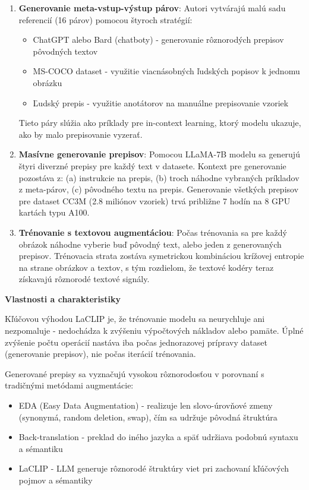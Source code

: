 \documentclass[]{tukediphc}
\begin{document}
\begin{enumerate}
\item \textbf{Generovanie meta-vstup-výstup párov}: Autori vytvárajú malú sadu referencií (16 párov) pomocou štyroch stratégií:
\begin{itemize}
\item ChatGPT alebo Bard (chatboty) - generovanie rôznorodých prepisov pôvodných textov
\item MS-COCO dataset - využitie viacnásobných ľudských popisov k jednomu obrázku
\item Ľudský prepis - využitie anotátorov na manuálne prepisovanie vzoriek
\end{itemize}
Tieto páry slúžia ako príklady pre in-context learning, ktorý modelu ukazuje, ako by malo prepisovanie vyzerať\cite{LaCLIP}.

\item \textbf{Masívne generovanie prepisov}: Pomocou LLaMA-7B modelu sa generujú štyri diverzné prepisy pre každý text v datasete. Kontext pre generovanie pozostáva z: (a) instrukcie na prepis, (b) troch náhodne vybraných príkladov z meta-párov, (c) pôvodného textu na prepis. Generovanie všetkých prepisov pre dataset CC3M (2.8 miliónov vzoriek) trvá približne 7 hodín na 8 GPU kartách typu A100\cite{LaCLIP}.

\item \textbf{Trénovanie s textovou augmentáciou}: Počas trénovania sa pre každý obrázok náhodne vyberie buď pôvodný text, alebo jeden z generovaných prepisov. Trénovacia strata zostáva symetrickou kombináciou krížovej entropie na strane obrázkov a textov, s tým rozdielom, že textové kodéry teraz získavajú rôznorodé textové signály\cite{LaCLIP}.
\end{enumerate}

\textbf{Vlastnosti a charakteristiky}

Kľúčovou výhodou LaCLIP je, že trénovanie modelu sa neurychluje ani nezpomaluje - nedochádza k zvýšeniu výpočtových nákladov alebo pamäte. Úplné zvýšenie počtu operácií nastáva iba počas jednorazovej prípravy dataset (generovanie prepisov), nie počas iterácií trénovania.

Generované prepisy sa vyznačujú vysokou rôznorodosťou v porovnaní s tradičnými metódami augmentácie:
\begin{itemize}
\item EDA (Easy Data Augmentation) - realizuje len slovo-úrovňové zmeny (synonymá, random deletion, swap), čím sa udržuje pôvodná štruktúra\cite{LaCLIP}
\item Back-translation - preklad do iného jazyka a späť udržiava podobnú syntaxu a sémantiku\cite{LaCLIP}
\item LaCLIP - LLM generuje rôznorodé štruktúry viet pri zachovaní kľúčových pojmov a sémantiky\cite{LaCLIP}
\end{itemize}
\end{document}
